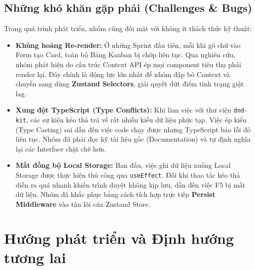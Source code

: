 \section{Những khó khăn gặp phải (Challenges \& Bugs)}
Trong quá trình phát triển, nhóm cũng đối mặt với không ít thách thức kỹ thuật:
\begin{itemize}
    \item \textbf{Khủng hoảng Re-render:} Ở những Sprint đầu tiên, mỗi khi gõ chữ vào Form tạo Card, toàn bộ Bảng Kanban bị chớp liên tục. Qua nghiên cứu, nhóm phát hiện do cấu trúc Context API ép mọi component tiêu thụ phải render lại. Đây chính là động lực lớn nhất để nhóm đập bỏ Context và chuyển sang dùng \textbf{Zustand Selectors}, giải quyết dứt điểm tình trạng giật lag.
    \item \textbf{Xung đột TypeScript (Type Conflicts):} Khi làm việc với thư viện \texttt{dnd-kit}, các sự kiện kéo thả trả về rất nhiều kiểu dữ liệu phức tạp. Việc ép kiểu (Type Casting) sai dẫn đến việc code chạy được nhưng TypeScript báo lỗi đỏ liên tục. Nhóm đã phải đọc kỹ tài liệu gốc (Documentation) và tự định nghĩa lại các Interface chặt chẽ hơn.
    \item \textbf{Mất đồng bộ Local Storage:} Ban đầu, việc ghi dữ liệu xuống Local Storage được thực hiện thủ công qua \texttt{useEffect}. Đôi khi thao tác kéo thả diễn ra quá nhanh khiến trình duyệt không kịp lưu, dẫn đến việc F5 bị mất dữ liệu. Nhóm đã khắc phục bằng cách tích hợp trực tiếp \textbf{Persist Middleware} vào tận lõi của Zustand Store.
\end{itemize}

\chapter{Hướng phát triển và Định hướng tương lai}

